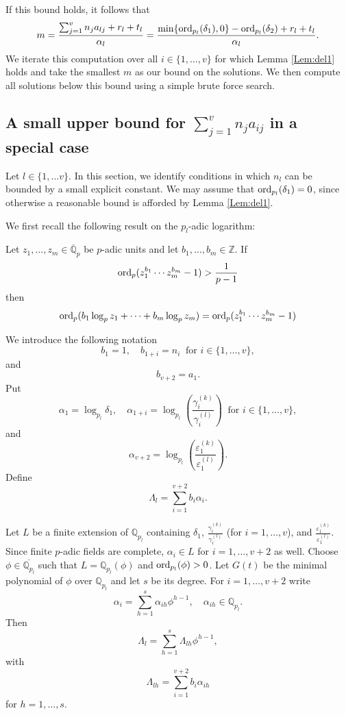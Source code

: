 If this bound holds, it follows that
\[m = \frac{\sum_{j = 1}^{v}n_ja_{lj} + r_l + t_l}{\alpha_l} = \frac{\min\{\operatorname{ord}_{p_l}(\delta_1), 0\} - \operatorname{ord}_{p_l}(\delta_2) + r_l + t_l}{\alpha_l}. \]
We iterate this computation over all $i \in \{1, \dots, v \}$ for which Lemma \ref{Lem:del1} holds and take the smallest $m$ as our bound on the solutions. We then compute all solutions below this bound using a simple brute force search. 

\subsection{A small upper bound for $\sum_{j = 1}^v n_ja_{ij}$ in a special case} \label{subsec:smallbound}

Let $l \in \{1, \dots v\}$. In this section, we identify conditions in which $n_l$ can be bounded by a small explicit constant. We may assume that $\operatorname{ord}_{p_l}(\delta_1) = 0$, since otherwise a reasonable bound is afforded by Lemma \ref{Lem:del1}. 

We first recall the following result on the $p_l$-adic logarithm:

\begin{lemma}\label{Lem:padic}
Let $z_1, \dots, z_m \in \overline{\mathbb{Q}}_p$ be $p$-adic units and let $b_1, \dots, b_m \in \mathbb{Z}$. If
\[\operatorname{ord}_p(z_1^{b_1}\cdots z_m^{b_m} - 1) > \frac{1}{p-1}\]
then
\[\operatorname{ord}_p(b_1\log_p z_1 + \cdots + b_m \log_p z_m) = \operatorname{ord}_p(z_1^{b_1}\cdots z_m^{b_m} - 1) \]
\end{lemma}

We introduce the following notation
\[b_1 = 1, \quad b_{1+i} = n_i \ \text{ for } i \in \{1, \dots, v\},\]
and
\[ b_{v+2} = a_1.\]
Put
\[\alpha_1 = \log_{p_l} \delta_1, \quad \alpha_{1+i} = \log_{p_l}\left( \frac{\gamma_i^{(k)}}{\gamma_i^{(l)}}\right)  \ \text{ for } i \in \{1, \dots, v\},\]
and
\[\alpha_{v+2} = \log_{p_l}\left( \frac{\varepsilon_1^{(k)}}{\varepsilon_1^{(l)}}\right).\]
Define
\[\Lambda_l = \sum_{i = 1}^{v+2} b_i\alpha_i.\]

Let $L$ be a finite extension of $\mathbb{Q}_{p_l}$ containing $\delta_1$, $\frac{\gamma_i^{(k)}}{\gamma_i^{(l)}}$ (for $i = 1, \dots, v$), and $ \frac{\varepsilon_1^{(k)}}{\varepsilon_1^{(l)}}$. Since finite $p$-adic fields are complete, $\alpha_i \in L$ for $i = 1, \dots, v+2$ as well. Choose $\phi \in \overline{\mathbb{Q}_{p_l}}$ such that $L = \mathbb{Q}_{p_l}(\phi)$ and $\operatorname{ord}_{p_l}(\phi) > 0 $. Let $G(t)$ be the minimal polynomial of $\phi$ over $\mathbb{Q}_{p_l}$ and let $s$ be its degree. For $i = 1, \dots, v+2$ write
\[\alpha_i = \sum_{h = 1}^s \alpha_{ih}\phi^{h - 1}, \quad \alpha_{ih} \in \mathbb{Q}_{p_l}.\]
Then
\begin{equation} \label{Eq:lambdalh}
\Lambda_l = \sum_{h = 1}^s \Lambda_{lh}\phi^{h-1},
\end{equation}
with
\[\Lambda_{lh} = \sum_{i = 1}^{v+2} b_i \alpha_{ih}\]
for $h = 1, \dots, s$. 

